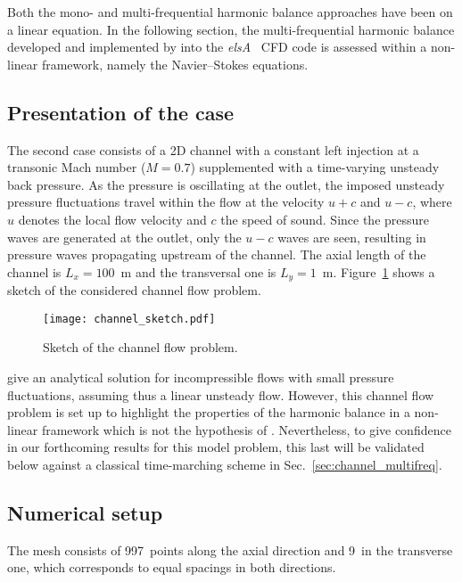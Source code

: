 
Both the mono- and multi-frequential harmonic balance
approaches have been on a linear equation. In the following
section, the multi-frequential harmonic balance developed and
implemented by \citet{ThesisGuedeney} into the \emph{elsA}~\cite{Cambier2013}
CFD code is assessed within a non-linear framework, namely the
Navier--Stokes equations.

\subsection{Presentation of the case}
\label{sec:channel_flow_problem}

The second case consists of a 2D channel 
with a constant left injection at 
a transonic Mach number ($M=0.7$)
supplemented with a time-varying unsteady back pressure.
As the pressure is oscillating at the outlet, the imposed unsteady pressure
fluctuations travel within the flow at the velocity 
$u + c$ and $u - c$, where $u$ denotes 
the local flow velocity and $c$ the speed of sound.
Since the pressure waves are generated at the outlet, only
the $u-c$ waves are seen, resulting in pressure waves propagating
upstream of the channel. The axial length of the channel is $L_x = 100$~m
and the transversal one is $L_y = 1$~m.
Figure~\ref{fig:canal_principle} shows a sketch
of the considered channel flow problem.
\begin{figure}[htp]
  \centering
  \texttt{[image: channel\_sketch.pdf]}
  \caption{Sketch of the channel flow problem.}
  \label{fig:canal_principle}
\end{figure}

\citet{Merkle1987} give an analytical solution
for incompressible flows with small pressure fluctuations, assuming
thus a linear unsteady flow.
However, this channel flow problem is set up to highlight the properties
of the harmonic balance in a non-linear framework which is not
the hypothesis of \citet{Merkle1987}. Nevertheless, to give confidence
in our forthcoming results for this model problem,
this last will be validated below against a classical time-marching scheme
in Sec.~\ref{sec:channel_multifreq}.

\subsection{Numerical setup}

The mesh consists of 997~points along the axial direction and 9~in the
transverse one, which corresponds to equal spacings in both
directions. 

